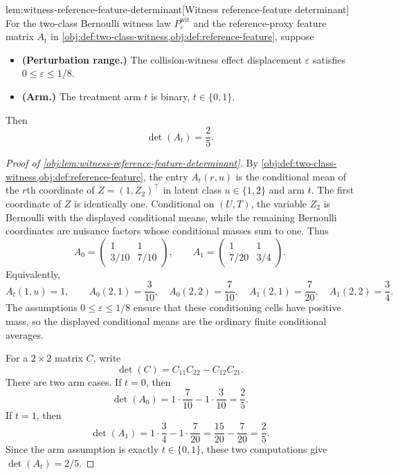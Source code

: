 \documentclass[11pt]{article}
\begin{document}
\begin{lemmav}{lem:witness-reference-feature-determinant}[Witness reference-feature determinant]
For the two-class Bernoulli witness law \(P_{\varepsilon}^{\mathrm{wit}}\) and the reference-proxy feature matrix \(A_t\) in \cref{obj:def:two-class-witness,obj:def:reference-feature}, suppose
\begin{itemize}
\item \textbf{(Perturbation range.)} The collision-witness effect displacement \(\varepsilon\) satisfies \(0\le \varepsilon\le 1/8\).
\item \textbf{(Arm.)} The treatment arm \(t\) is binary, \(t\in\{0,1\}\).
\end{itemize}
Then
\[
\det(A_t)=\frac25 .
\]
\end{lemmav}

\begin{proof}[Proof of \cref{obj:lem:witness-reference-feature-determinant}]
By \cref{obj:def:two-class-witness,obj:def:reference-feature}, the entry \(A_t(r,u)\) is the conditional mean of the \(r\)th coordinate of \(Z=(1,Z_2)^\top\) in latent class \(u\in\{1,2\}\) and arm \(t\). The first coordinate of \(Z\) is identically one. Conditional on \((U,T)\), the variable \(Z_2\) is Bernoulli with the displayed conditional means, while the remaining Bernoulli coordinates are nuisance factors whose conditional masses sum to one. Thus
\[
A_0
=
\begin{pmatrix}
1&1\\[0.2em]
3/10&7/10
\end{pmatrix},
\qquad
A_1
=
\begin{pmatrix}
1&1\\[0.2em]
7/20&3/4
\end{pmatrix}.
\]
Equivalently,
\[
A_t(1,u)=1,\qquad
A_0(2,1)=\frac{3}{10},\quad
A_0(2,2)=\frac{7}{10},\quad
A_1(2,1)=\frac{7}{20},\quad
A_1(2,2)=\frac34 .
\]
The assumptions \(0\le\varepsilon\le1/8\) ensure that these conditioning cells have positive mass, so the displayed conditional means are the ordinary finite conditional averages. %

For a \(2\times2\) matrix \(C\), write
\[
\det(C)=C_{11}C_{22}-C_{12}C_{21}.
\]
There are two arm cases. If \(t=0\), then
\[
\det(A_0)
=
1\cdot\frac{7}{10}-1\cdot\frac{3}{10}
=
\frac25 .
\]
If \(t=1\), then
\[
\det(A_1)
=
1\cdot\frac34-1\cdot\frac{7}{20}
=
\frac{15}{20}-\frac{7}{20}
=
\frac25 .
\]
Since the arm assumption is exactly \(t\in\{0,1\}\), these two computations give \(\det(A_t)=2/5\). %
\end{proof}
\end{document}
